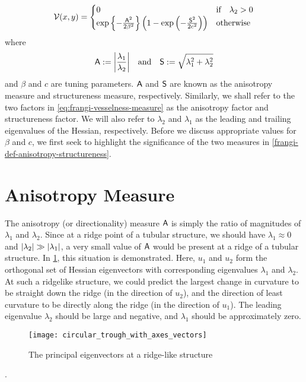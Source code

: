 \begin{equation} \label{eq:frangi-vesselness-measure}
\V(x,y) = \begin{cases}
0 & \text{if} \quad \lambda_2 > 0 \\
\exp\left\{-\frac{\Am^2}{2\beta^2}\right\}
\left(1 - \exp\left(-\frac{\Sm^2}{2c^2}\right)\right) & \text{otherwise}
\end{cases} \end{equation}
where
\begin{equation} \label{frangi-def-anisotropy-structureness}
\Am := \abs*{\frac{\lambda_1}{\lambda_2}}
\quad \textrm{and} \quad 
\Sm := \sqrt{\lambda_1^2 + \lambda_2^2}
\end{equation}
and $\beta$ and $c$ are tuning parameters. $\Am$ and $\Sm$ are known as the anisotropy measure and structureness measure, respectively. Similarly, we shall refer to the two factors in \cref{eq:frangi-vesselness-measure} as the anisotropy factor and structureness factor. We will also refer to $\lambda_2$ and $\lambda_1$ as the leading and trailing eigenvalues of the Hessian, respectively. Before we discuss appropriate values for $\beta$ and $c$, we first seek to highlight the significance of the two measures in \cref{frangi-def-anisotropy-structureness}.

\section{Anisotropy Measure} \label{sec:frangi.anisotropy}
The anisotropy (or directionality) measure $\Am$ is simply the ratio of magnitudes of $\lambda_1$ and $\lambda_2$. Since at a ridge point of a tubular structure, we should have $\lambda_1 \approx 0$ and $\abs*{\lambda_2} \gg \abs*{\lambda_1}$,
a very small value of $\Am$ would be present at a ridge of a tubular structure.
In \cref{fig:circular_trough_with_axes_vectors}, this situation is demonstrated. Here, $u_1$ and $u_2$ form the orthogonal set of Hessian eigenvectors with corresponding eigenvalues $\lambda_1$ and $\lambda_2$. At such a ridgelike structure, we could predict the largest change in curvature to be straight down the ridge (in the direction of $u_2$), and the direction of least curvature to be directly along the ridge (in the direction  of $u_1$). The leading eigenvalue $\lambda_2$ should be large and negative, and $\lambda_1$ should be approximately zero.

\begin{figure} \centering
  \texttt{[image: circular\_trough\_with\_axes\_vectors]}
  \caption{The principal eigenvectors at a ridge-like structure} 
  \label{fig:circular_trough_with_axes_vectors}
\end{figure}. 


